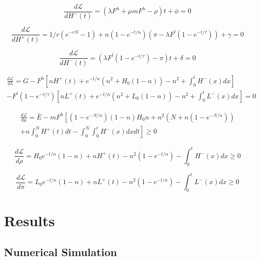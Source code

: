\documentclass[singlespace]{easychithesis}
\newcommand{\Lagr}{\mathcal{L}}
\begin{document}
\begin{equation}\label{eq:dLdH-}
\frac{d\Lagr}{dH^-(t)} = (\lambda F^h +\mu m F^h - \rho)t + \phi = 0
\end{equation}

\begin{equation}\label{eq:dLdL+}
\frac{d\Lagr}{dH^+(t)} = 1/r(e^{-rN} -1) + n(1-e^{-t/n})(\pi - \lambda F^l(1-e^{-t/\tau})) + \gamma = 0
\end{equation}

\begin{equation}\label{eq:dLdL-}
\frac{d\Lagr}{dH^-(t)} = (\lambda F^l(1-e^{-t/\tau}) - \pi)t + \delta = 0
\end{equation}

\begin{multline}\label{eq:dLdlambda}
\frac{d\Lagr}{d\lambda} = G - F^h\left[nH^+(t) + e^{-t/n}(n^2 + H_0(1-n)) - n^2 + \int_0^tH^-(x)dx\right] \\ - F^l (1-e^{-t/\tau})\left[nL^+(t) + e^{-t/n}(n^2 + L_0(1-n)) - n^2 + \int_0^tL^-(x)dx\right] = 0
\end{multline}

\begin{multline}\label{eq:dLdmu}
\frac{d\Lagr}{d\mu} = \bar{E} - mF^h \left [(1-e^{-N/n})(1-n)H_0 n + n^2(N + n(1-e^{-N/n})) \right.\\ + \left. n\int_0^N H^+(t) dt - \int_0^N\int_0^t H^-(x)dx dt   \right] \geq 0
\end{multline}

\begin{equation}\label{eq:dLdrho}
\frac{d\Lagr}{d\rho} = H_0 e^{-t/n}(1-n) + nH^+(t) - n^2(1-e^{-t/n}) - \int_0^t H^-(x)dx \geq 0 
\end{equation}

\begin{equation}\label{eq:dLdpi}
\frac{d\Lagr}{d\pi} = L_0 e^{-t/n}(1-n) + nL^+(t) - n^2(1-e^{-t/n}) - \int_0^t L^-(x)dx \geq 0 
\end{equation}





\chapter{Results}
\section{Numerical Simulation}
\end{document}
